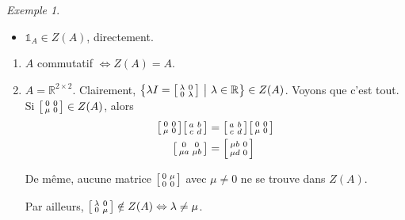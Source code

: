 \documentclass{report}
\theoremstyle{definition}
\theoremstyle{remark}
\newtheorem*{exem}{Exemple}
\def\RR{\mathbb{R}}
\def\id{\mathds{1}}
\begin{document}
\begin{exem}
\begin{enumerate}
\begin{itemize}
				Donc, $a,a' \in Z(A) \Rightarrow aa' \in Z(A)$.
				\item $\id_A \in Z(A)$, directement.
			\end{itemize}
			\begin{enumerate}
				\item $A$ commutatif $\Leftrightarrow Z(A)=A$.
				\item $A=\RR^{2\times2}$. Clairement, $\left\{ \lambda I = \begin{bsmallmatrix}
					\lambda&0\\0&\lambda
				\end{bsmallmatrix} ~\middle|~ \lambda\in\RR \right\} \in Z(A)$. Voyons que c'est tout. Si $\begin{bsmallmatrix}
					0&0\\\mu&0
				\end{bsmallmatrix} \in Z(A)$, alors
				\begin{align*}
					\begin{bsmallmatrix}
						0&0\\\mu&0
					\end{bsmallmatrix} \begin{bsmallmatrix}
						a&b\\c&d
					\end{bsmallmatrix} &= \begin{bsmallmatrix}
						a&b\\c&d
					\end{bsmallmatrix} \begin{bsmallmatrix}
						0&0\\\mu&0
					\end{bsmallmatrix}\\
					\begin{bsmallmatrix}
						0&0\\\mu a&\mu b
					\end{bsmallmatrix} &= \begin{bsmallmatrix}
						\mu b&0\\\mu d&0
					\end{bsmallmatrix}
				\end{align*}

				De m\^eme, aucune matrice $\begin{bsmallmatrix}
					0&\mu\\0&0
				\end{bsmallmatrix}$ avec $\mu\neq0$ ne se trouve dans $Z(A)$.

				Par ailleurs, $\begin{bsmallmatrix}
					\lambda&0\\0&\mu
				\end{bsmallmatrix} \notin Z(A) \Leftrightarrow \lambda\neq\mu$.
			\end{enumerate}
		\end{enumerate}
	\end{exem}
\end{document}

